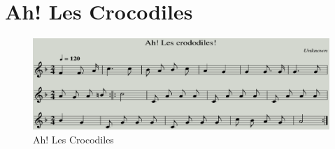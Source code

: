 \section{Ah! Les Crocodiles}



\begin{figure}[!htbp]
  \includegraphics[width=\textwidth,height=\textheight,keepaspectratio]{../songs/xx_ah_les_crocodiles.png}
  \caption{Ah! Les Crocodiles}
  \label{fig:xx_ah_les_crocodiles}
\end{figure}
